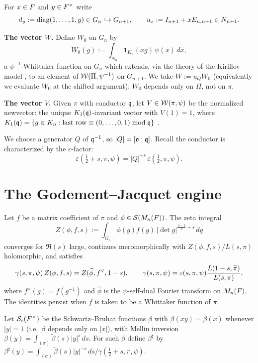 \documentclass[11pt]{article}
\begin{document}
For $x\in F$ and $y\in F^\times$ write
\[
d_y:=\operatorname{diag}(1,\dots,1,y)\in G_n\hookrightarrow G_{n+1},\qquad
u_x:=I_{n+1}+xE_{n,n+1}\in N_{n+1}.
\]

\noindent\textbf{The vector $W$.} Define $W_0$ on $G_n$ by
\begin{equation}\label{eq:W0}
W_0(g):=\int_{N_n}\mathbf 1_{K_n}(xg)\,\psi(x)\,dx,
\end{equation}
a $\psi^{-1}$-Whittaker function on $G_n$ which extends, via the theory of the
Kirillov model \cite{Bernstein}, to an element of $\mathcal{W}(\Pi,\psi^{-1})$ on
$G_{n+1}$. We take $W:=u_Q W_0$ (equivalently we evaluate $W_0$ at the shifted
argument); $W_0$ depends only on $\Pi$, not on $\pi$.

\noindent\textbf{The vector $V$.} Given $\pi$ with conductor $\mathfrak{q}$, let
$V\in\mathcal{W}(\pi,\psi)$ be the normalized newvector: the unique $K_1(\mathfrak{q})$-invariant
vector with $V(1)=1$, where
$K_1(\mathfrak{q})=\{g\in K_n:\text{last row}\equiv(0,\dots,0,1)\bmod\mathfrak{q}\}$
\cite{JPSS81,Matringe}.

We choose a generator $Q$ of $\mathfrak{q}^{-1}$, so $|Q|=[\mathfrak{o}:\mathfrak{q}]$. Recall the
conductor is characterized by the $\varepsilon$-factor:
\begin{equation}\label{eq:eps}
\varepsilon(\tfrac12+s,\pi,\psi)=|Q|^{-s}\,\varepsilon(\tfrac12,\pi,\psi).
\end{equation}

\section*{The Godement--Jacquet engine}

\begin{qtwolemma}\label{lem:GJ}
Let $f$ be a matrix coefficient of $\pi$ and $\phi\in\mathcal{S}(M_n(F))$. The zeta
integral
\[
Z(\phi,f,s):=\int_{G_n}\phi(g)f(g)\,|\det g|^{\frac{n-1}{2}+s}\,dg
\]
converges for $\Re(s)$ large, continues meromorphically with
$Z(\phi,f,s)/L(s,\pi)$ holomorphic, and satisfies
\[
\gamma(s,\pi,\psi)\,Z(\phi,f,s)=Z(\widehat\phi,f^\vee,1-s),\qquad
\gamma(s,\pi,\psi)=\varepsilon(s,\pi,\psi)\frac{L(1-s,\widetilde{\pi})}{L(s,\pi)},
\]
where $f^\vee(g)=f(g^{-1})$ and $\widehat\phi$ is the $\psi$-self-dual Fourier
transform on $M_n(F)$. The identities persist when $f$ is taken to be a
Whittaker function of $\pi$.
\end{qtwolemma}

Let $\mathcal{S}_{\mathrm e}(F^\times)$ be the Schwartz--Bruhat functions $\beta$ with
$\beta(xy)=\beta(x)$ whenever $|y|=1$ (i.e.\ $\beta$ depends only on $|x|$),
with Mellin inversion $\beta(y)=\int_{(\sigma)}\tilde\beta(s)|y|^s\,ds$. For such
$\beta$ define $\beta^\sharp$ by
$\beta^\sharp(y)=\int_{(\sigma)}\tilde\beta(s)|y|^{-s}\,ds/\gamma(\tfrac12+s,\pi,\psi)$.
\end{document}
